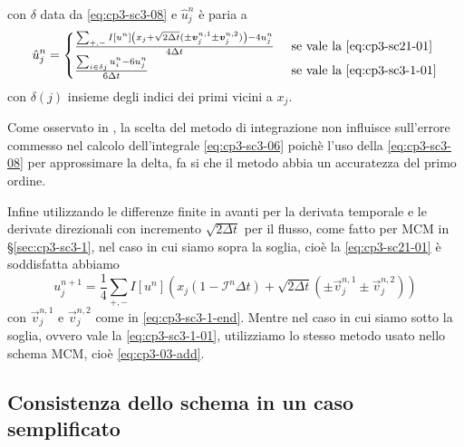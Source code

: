 con $\delta$ data da \eqref{eq:cp3-sc3-08} e $\hat{u}_j^n$ è paria a 
\[
\hat{u}_j^n=
\begin{cases}
\frac{\sum_{+,-}I[u^n]\left(x_j+\sqrt{2\Delta
    t}(\pm\vec{v}_j^{n,1}\pm\vec{v}_j^{n,2})\right)-4u_j^n}{4\Delta t}
&\text{ se vale la \eqref{eq:cp3-sc21-01}} \\
\frac{\sum_{i\in\delta{j}}u_i^n-6u_j^n}{6\Delta t}&\text{ se vale la \eqref{eq:cp3-sc3-1-01}}
\end{cases}
\]
con $\delta(j)$ insieme degli indici dei  primi vicini a $x_j$.
\begin{osservazione}
Come osservato in \cite[][§1.5]{osher:fed}, la scelta del metodo di
integrazione non influisce sull'errore commesso nel calcolo
dell'integrale \eqref{eq:cp3-sc3-06} poichè l'uso della
\eqref{eq:cp3-sc3-08} per approssimare la delta, fa si che il  metodo
abbia un accuratezza del primo ordine.
\end{osservazione}
Infine utilizzando le differenze finite in avanti per la derivata
temporale e le derivate direzionali con incremento $\sqrt{2\Delta t}$
per il flusso, come fatto per MCM in §\ref{sec:cp3-sc3-1}, nel caso in
cui siamo sopra la soglia, cioè la \eqref{eq:cp3-sc21-01} è soddisfatta abbiamo
\begin{equation}
  \label{eq:cp3-sc3-09}
  u_j^{n+1}=\frac{1}{4}\sum_{+,-}I[u^n]\left(x_j(1-\mathcal{I}^n\Delta
  t)+ \sqrt{2\Delta t}(\pm\vec{v}_j^{n,1}\pm\vec{v}_j^{n,2})\right)
\end{equation}
con $\vec{v}_j^{n,1}$ e $\vec{v}_j^{n,2}$ come in
\eqref{eq:cp3-sc3-1-end}. Mentre nel caso in cui siamo sotto la
soglia, ovvero vale la \eqref{eq:cp3-sc3-1-01}, utilizziamo lo stesso
metodo usato nello schema MCM, cioè \eqref{eq:cp3-03-add}.
%
\subsection{Consistenza dello schema in un caso semplificato}
  \label{subsec:cp3-sc3-3-2}

